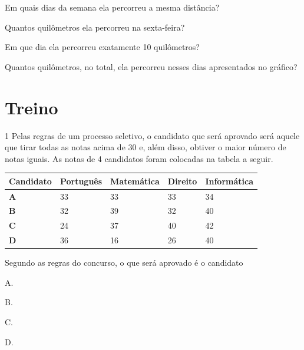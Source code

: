 \begin{escolha}
\item
  Em quais dias da semana ela percorreu a mesma distância?\\

\item
  Quantos quilômetros ela percorreu na sexta-feira?\\

\item
  Em que dia ela percorreu exatamente 10 quilômetros?\\

\item
  Quantos quilômetros, no total, ela percorreu nesses dias apresentados no gráfico?\\
\end{escolha}

\pagebreak
\section*{Treino}

\num{1} Pelas regras de um processo seletivo, o candidato que será aprovado será
aquele que tirar todas as notas acima de 30 e, além disso, obtiver o maior
número de notas iguais. As notas de 4 candidatos foram colocadas na
tabela a seguir.

\begin{longtable}[]{@{}lllll@{}}
\toprule
\textbf{Candidato} & \textbf{Português} & \textbf{Matemática} & \textbf{Direito} &
\textbf{Informática}\tabularnewline
\midrule
\endhead
\textbf{A} & 33 & 33 & 33 & 34\tabularnewline
\textbf{B} & 32 & 39 & 32 & 40\tabularnewline
\textbf{C} & 24 & 37 & 40 & 42\tabularnewline
\textbf{D} & 36 & 16 & 26 & 40\tabularnewline
\bottomrule
\end{longtable}

Segundo as regras do concurso, o que será aprovado é o candidato

\begin{multicols}{2}
\begin{escolha}
\item
  A.
\item
  B.
\item
  C.
\item
  D.
\end{escolha}
\end{multicols}


